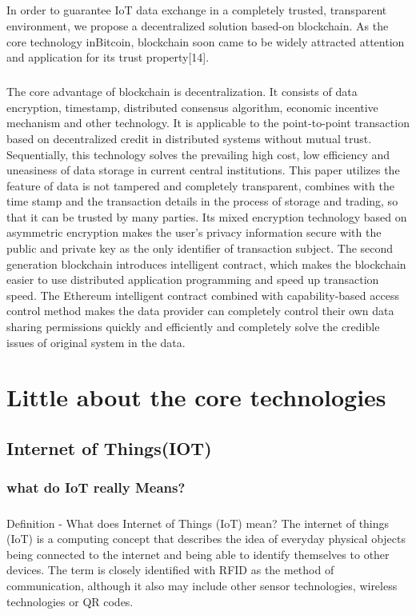 \paragraph{}In order to guarantee IoT data exchange in a completely
trusted, transparent environment, we propose a decentralized
solution based-on blockchain. As the core technology inBitcoin, blockchain soon came to be widely attracted
attention and application for its trust property[14].
\paragraph{}The core advantage of blockchain is decentralization. It consists of data encryption, timestamp, distributed consensus
algorithm, economic incentive mechanism and other
technology. It is applicable to the point-to-point transaction
based on decentralized credit in distributed systems without
mutual trust. Sequentially, this technology solves the
prevailing high cost, low efficiency and uneasiness of data
storage in current central institutions. This paper utilizes the feature of data is not tampered and completely transparent, combines with the time stamp and the transaction details in the process of storage and trading, so that it can be trusted by many parties. Its mixed encryption technology based on asymmetric encryption makes the user's privacy information
secure with the public and private key as the only identifier
of transaction subject. The second generation blockchain
introduces intelligent contract, which makes the blockchain
easier to use distributed application programming and speed
up transaction speed. The Ethereum intelligent contract
combined with capability-based access control method
makes the data provider can completely control their own
data sharing permissions quickly and efficiently and
completely solve the credible issues of original system in the
data.
\chapter{Little about the core technologies}
\section{Internet of Things(IOT)}
\subsection{what do IoT really Means?} 

\paragraph{}Definition - What does Internet of Things (IoT) mean?
The internet of things (IoT) is a computing concept that describes the idea of everyday physical objects being connected to the internet and being able to identify themselves to other devices. The term is closely identified with RFID as the method of communication, although it also may include other sensor technologies, wireless technologies or QR codes.
